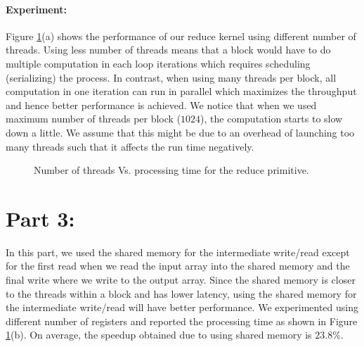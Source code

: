 \documentclass[12pt] {article}
\begin{document}
\paragraph{Experiment:} Figure \ref{fig:reduce}(a) shows the performance of our reduce kernel using different number of threads. Using less number of threads means that a block would have to do multiple computation in each loop iterations which requires scheduling (serializing) the process. In contrast, when using many threads per block, all computation in one iteration can run in parallel which maximizes the throughput and hence better performance is achieved. We notice that when we used maximum number of threads per block ($1024$), the computation starts to slow down a little. We assume that this might be due to an overhead of launching too many threads such that it affects the run time negatively. 
\begin{figure}[!tbh]
 \centering        
     \caption{Number of threads Vs. processing time for the reduce primitive.}
   \label{fig:reduce}
\end{figure}


\section*{Part 3:}
In this part, we used the shared memory for the intermediate write/read except for the first read when we read the input array into the shared memory and the final write where we write to the output array. Since the shared memory is closer to the threads within a block and has lower latency, using the shared memory for the intermediate write/read will have better performance. We experimented using different number of registers and reported the processing time as shown in Figure \ref{fig:reduce}(b). On average, the speedup obtained due to using shared memory is $23.8\%$. 
\end{document}
